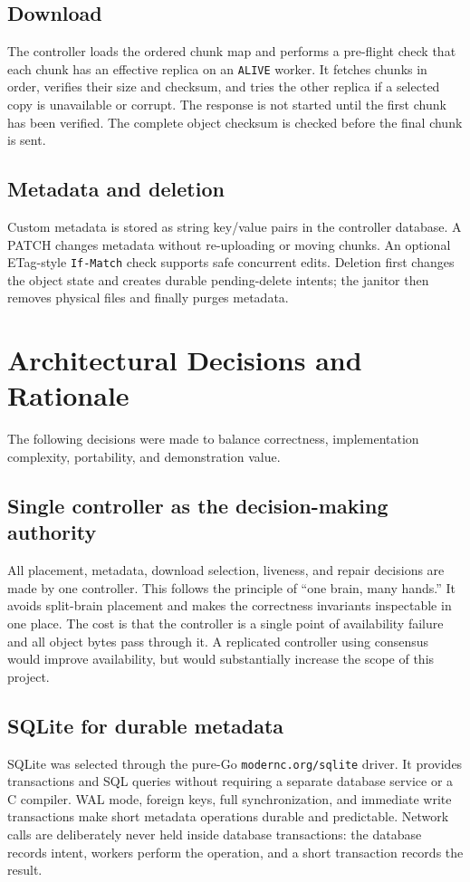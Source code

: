 \documentclass[11pt,a4paper]{article}
\begin{document}
\subsection{Download}
The controller loads the ordered chunk map and performs a pre-flight check that each chunk has an effective replica on an \texttt{ALIVE} worker. It fetches chunks in order, verifies their size and checksum, and tries the other replica if a selected copy is unavailable or corrupt. The response is not started until the first chunk has been verified. The complete object checksum is checked before the final chunk is sent.

\subsection{Metadata and deletion}
Custom metadata is stored as string key/value pairs in the controller database. A PATCH changes metadata without re-uploading or moving chunks. An optional ETag-style \texttt{If-Match} check supports safe concurrent edits. Deletion first changes the object state and creates durable pending-delete intents; the janitor then removes physical files and finally purges metadata.

\section{Architectural Decisions and Rationale}

The following decisions were made to balance correctness, implementation complexity, portability, and demonstration value.

\subsection{Single controller as the decision-making authority}
All placement, metadata, download selection, liveness, and repair decisions are made by one controller. This follows the principle of ``one brain, many hands.'' It avoids split-brain placement and makes the correctness invariants inspectable in one place. The cost is that the controller is a single point of availability failure and all object bytes pass through it. A replicated controller using consensus would improve availability, but would substantially increase the scope of this project.

\subsection{SQLite for durable metadata}
SQLite was selected through the pure-Go \texttt{modernc.org/sqlite} driver. It provides transactions and SQL queries without requiring a separate database service or a C compiler. WAL mode, foreign keys, full synchronization, and immediate write transactions make short metadata operations durable and predictable. Network calls are deliberately never held inside database transactions: the database records intent, workers perform the operation, and a short transaction records the result.
\end{document}
